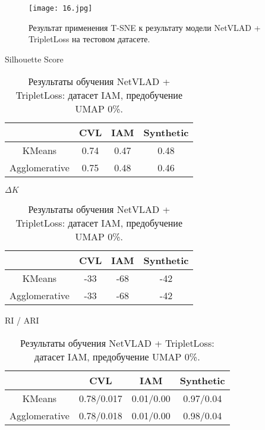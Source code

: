 \begin{figure}[htbp]
    \centering
    \texttt{[image: 16.jpg]}
    \captionsetup{width=0.9\textwidth}
    \caption{Результат применения T-SNE к результату модели NetVLAD + TripletLoss на тестовом датасете.}
    \label{fig:triplet}
\end{figure}

\begin{table}[ht]
    \centering
    \captionsetup{width=0.9\textwidth}

    \hspace*{-4em}\scalebox{0.9} {
        \begin{subtable}{0.5\linewidth}
            \centering
            \caption{Silhouette Score}
            \begin{tabular}{|c|c|c|c|}
            \hline
                & CVL & IAM & Synthetic \\
            \hline
            KMeans & 0.74 & 0.47 & 0.48 \\
            Agglomerative & 0.75 & 0.48 & 0.46 \\
            \hline
            \end{tabular}
        \end{subtable}

        \hfill
        \begin{subtable}{0.5\linewidth}
            \centering
            \caption{$\Delta K$}
            \begin{tabular}{|c|c|c|c|}
            \hline
                & CVL & IAM & Synthetic \\
            \hline
            KMeans & -33 & -68 & -42 \\
            Agglomerative & -33 & -68 & -42 \\
            \hline
            \end{tabular}
        \end{subtable}
    }

    \baselineskip
    \hspace*{-4em}\scalebox{0.9} {
        \begin{subtable}{0.5\linewidth}
            \centering
            \caption{RI / ARI}
            \begin{tabular}{|c|c|c|c|}
            \hline
                & CVL & IAM & Synthetic \\
            \hline
            KMeans & 0.78/0.017 & 0.01/0.00 & 0.97/0.04 \\
            Agglomerative & 0.78/0.018 & 0.01/0.00 & 0.98/0.04 \\
            \hline
            \end{tabular}
        \end{subtable}
    }
    
    \caption{Результаты обучения NetVLAD + TripletLoss: датасет IAM, предобучение UMAP 0\%.}

    \label{table:third}
\end{table}


